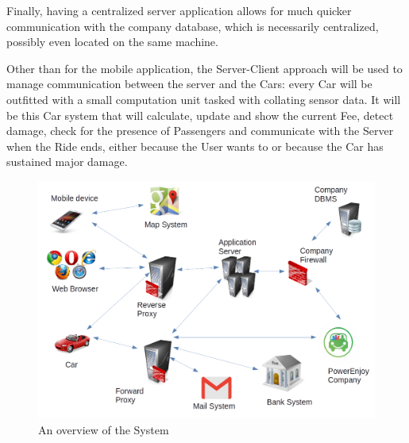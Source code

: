 \documentclass[12pt]{article}
\begin{document}
Finally, having a centralized server application allows for much quicker communication with the company database, which is necessarily centralized, possibly even located on the same machine.

Other than for the mobile application, the Server-Client approach will be used to manage communication between the server and the Cars: every Car will be outfitted with a small computation unit tasked with collating sensor data. It will be this Car system that will calculate, update and show the current Fee, detect damage, check for the presence of Passengers and communicate with the Server when the Ride ends, either because the User wants to or because the Car has sustained major damage.

\begin{figure}[h]
	\centering
	\includegraphics[width=\textwidth]{../Images/Overview}
	\caption{An overview of the System}
\end{figure}

\clearpage
\end{document}
